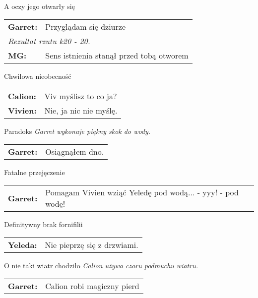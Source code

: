 \documentclass[10pt,twoside,twocolumn]{book}
\begin{document}
\begin{rpg-quotebox}{A oczy jego otwarły się}
   \begin{tabularx}{\columnwidth}{lX}
      \textbf{Garret:} & Przyglądam się dziurze\\
      \multicolumn{2}{X}{\textit{Rezultat rzutu k20 - 20.}}\\
      \textbf{MG:} & Sens istnienia stanął przed tobą otworem\\
   \end{tabularx}
\end{rpg-quotebox}


\begin{rpg-quotebox}{Chwilowa nieobecność}
   \begin{tabularx}{\columnwidth}{lX}
      \textbf{Calion:} & Viv myślisz to co ja?\\
      \textbf{Vivien:} & Nie, ja nic nie myślę.\\
   \end{tabularx}
\end{rpg-quotebox}


\begin{rpg-quotebox}{Paradoks}
   \textit{Garret wykonuje piękny skok do wody.}\\
   \newline
   \begin{tabularx}{\columnwidth}{lX}
      \textbf{Garret:} & Osiągnąłem dno.\\
   \end{tabularx}
\end{rpg-quotebox}


\begin{rpg-quotebox}{Fatalne przejęczenie}
   \begin{tabularx}{\columnwidth}{lX}
      \textbf{Garret:} & Pomagam Vivien wziąć Yeledę pod wodą... - yyy! - pod wodę!\\
   \end{tabularx}
\end{rpg-quotebox}


\begin{rpg-quotebox}{Definitywny brak fornifilii}
   \begin{tabularx}{\columnwidth}{lX}
      \textbf{Yeleda:} & Nie pieprzę się z drzwiami.\\
   \end{tabularx}
\end{rpg-quotebox}


\begin{rpg-quotebox}{O nie taki wiatr chodziło}
   \textit{Calion używa czaru podmuchu wiatru. }\\
   \newline
   \begin{tabularx}{\columnwidth}{lX}
      \textbf{Garret:} & Calion robi magiczny pierd\\
   \end{tabularx}
\end{rpg-quotebox}
\end{document}
